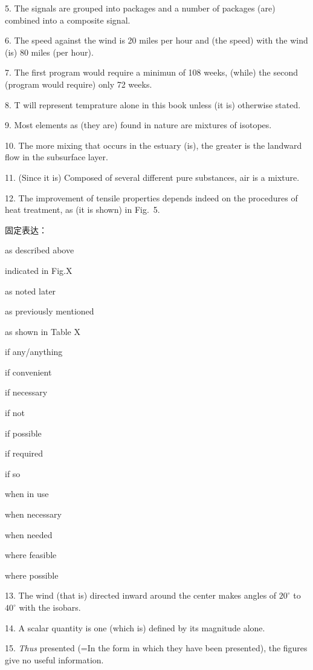 \documentclass[a4paper,twocolumn,10pt]{article}
\begin{document}
\begin{CJK}{UTF8}{gkai}
5. The signals are grouped into packages and a number of packages
(are) combined into a composite signal.

6. The speed against the wind is 20 miles per hour and 
(the speed) with the wind (is) 80 miles (per hour).

7. The first program would require a minimun of 108 weeks,
(while) the second (program would require) only 72 weeks.

8. T will represent temprature alone in this book unless
(it is) otherwise stated.

9. Most elements as (they are) found in nature are mixtures
of isotopes.

10. The more mixing that occurs in the estuary (is),
the greater is the landward flow in the subsurface layer.

11. (Since it is) Composed of several different pure
substances, air is a mixture.

12. The improvement of tensile properties depends indeed on
the procedures of heat treatment, as (it is shown) in Fig.~5.

\begin{framed}
固定表达：

as described above

indicated in Fig.X

as noted later

as previously mentioned

as shown in Table X

if any/anything

if convenient

if necessary

if not

if possible

if required

if so

when in use

when necessary

when needed

where feasible

where possible
\end{framed}

13. The wind (that is) directed inward around the center makes
angles of $20^\circ$ to $40^\circ$ with the isobars.

14. A scalar quantity is one (which is) defined by its magnitude
alone.

15. \emph{Thus} presented (=In the form in which they have been presented),
the figures give no useful information.


\end{CJK}
\end{document}
